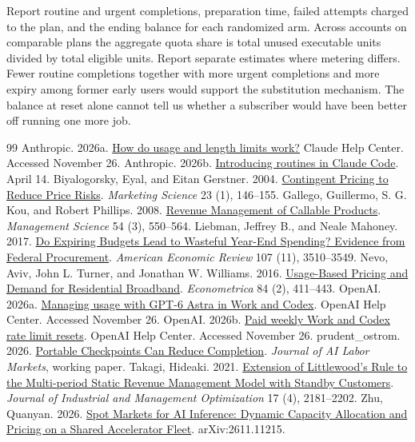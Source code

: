 \documentclass[11pt]{article}
\begin{document}
Report routine and urgent completions, preparation time, failed attempts charged to the plan, and the ending balance for each randomized arm. Across accounts on comparable plans the aggregate quota share is total unused executable units divided by total eligible units. Report separate estimates where metering differs. Fewer routine completions together with more urgent completions and more expiry among former early users would support the substitution mechanism. The balance at reset alone cannot tell us whether a subscriber would have been better off running one more job.

\small\begin{thebibliography}{99}\setlength{\itemsep}{1pt}
 Anthropic. 2026a. \href{https://support.claude.com/en/articles/11647753-how-do-usage-and-length-limits-work}{How do usage and length limits work?} Claude Help Center. Accessed November 26.
 Anthropic. 2026b. \href{https://claude.com/resources/articles/introducing-routines-in-claude-code}{Introducing routines in Claude Code}. April 14.
 Biyalogorsky, Eyal, and Eitan Gerstner. 2004. \href{https://pubsonline.informs.org/doi/10.1287/mksc.1030.0030}{Contingent Pricing to Reduce Price Risks}. \emph{Marketing Science} 23 (1), 146--155.
 Gallego, Guillermo, S. G. Kou, and Robert Phillips. 2008.
\href{https://doi.org/10.1287/mnsc.1070.0782}{Revenue Management of Callable Products}. \emph{Management Science} 54 (3), 550--564.
 Liebman, Jeffrey B., and Neale Mahoney. 2017.
\href{https://doi.org/10.1257/aer.20131296}{Do Expiring Budgets Lead to Wasteful Year-End Spending? Evidence from Federal Procurement}. \emph{American Economic Review} 107 (11), 3510--3549.
 Nevo, Aviv, John L. Turner, and Jonathan W. Williams. 2016.
\href{https://doi.org/10.3982/ECTA11927}{Usage-Based Pricing and Demand for Residential Broadband}.
\emph{Econometrica} 84 (2), 411--443.
 OpenAI. 2026a. \href{https://help.openai.com/en/articles/20001516-managing-usage-with-gpt-6-astra-in-work-and-codex}{Managing usage with GPT-6 Astra in Work and Codex}. OpenAI Help Center. Accessed November 26.
 OpenAI. 2026b. \href{https://help.openai.com/en/articles/20001507-paid-weekly-work-and-codex-rate-limit-resets}{Paid weekly Work and Codex rate limit resets}. OpenAI Help Center. Accessed November 26.
 prudent\_ostrom. 2026. \href{https://github.com/jnmarti/auto-research/tree/main/research/portable-checkpoints}{Portable Checkpoints Can Reduce Completion}. \emph{Journal of AI Labor Markets}, working paper.
 Takagi, Hideaki. 2021. \href{https://www.aimsciences.org/article/doi/10.3934/jimo.2020064}{Extension of Littlewood's Rule to the Multi-period Static Revenue Management Model with Standby Customers}. \emph{Journal of Industrial and Management Optimization} 17 (4), 2181--2202.
 Zhu, Quanyan. 2026. \href{https://arxiv.org/abs/2611.11215}{Spot Markets for AI Inference: Dynamic Capacity Allocation and Pricing on a Shared Accelerator Fleet}. arXiv:2611.11215.
\end{thebibliography}
\end{document}

